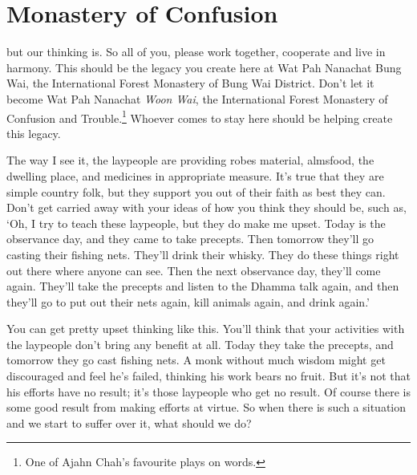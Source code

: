 

\chapter{Monastery of Confusion}

\vspace*{\baselineskip}
 but our thinking is. So all of you, please work together, cooperate and live in harmony. This should be the legacy you create here at Wat Pah Nanachat Bung Wai, the International Forest Monastery of Bung Wai District. Don't let it become Wat Pah Nanachat \textit{Woon Wai}, the International Forest Monastery of Confusion and Trouble.\footnote{One of Ajahn Chah's favourite plays on words.} Whoever comes to stay here should be helping create this legacy. 

The way I see it, the laypeople are providing robes material, almsfood, the dwelling place, and medicines in appropriate measure. It's true that they are simple country folk, but they support you out of their faith as best they can. Don't get carried away with your ideas of how you think they should be, such as, `Oh, I try to teach these laypeople, but they do make me upset. Today is the observance day, and they came to take precepts. Then tomorrow they'll go casting their fishing nets. They'll drink their whisky. They do these things right out there where anyone can see. Then the next observance day, they'll come again. They'll take the precepts and listen to the Dhamma talk again, and then they'll go to put out their nets again, kill animals again, and drink again.'

You can get pretty upset thinking like this. You'll think that your activities with the laypeople don't bring any benefit at all. Today they take the precepts, and tomorrow they go cast fishing nets. A monk without much wisdom might get discouraged and feel he's failed, thinking his work bears no fruit. But it's not that his efforts have no result; it's those laypeople who get no result. Of course there is some good result from making efforts at virtue. So when there is such a situation and we start to suffer over it, what should we do?


